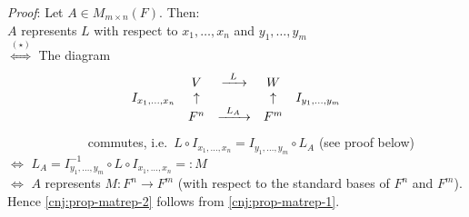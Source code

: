 \documentclass[
  12pt,
  a4paper,
  twoside]{article}
\theoremstyle{plain}
\theoremstyle{definition}
\begin{document}
\emph{Proof}:
Let \(A \in M_{m \times n}(F)\). Then:\\
\(A\) represents \(L\) with respect to \(x_{1}, \dots, x_{n}\) and \(y_{1}, \dots, y_{m}\)\\
\(\stackrel{(\star)}{\iff}\) The diagram
\[\begin{array}{r c c c l} &V & \xrightarrow{ \phantom{a} L \phantom{a}} & W \\
I_{x_1,\dots,x_n} & \uparrow & & \uparrow& I_{y_1,\dots,y_m} \\
& F^{n} & \xrightarrow{\phantom{a} L_{A} \phantom{a}} & F^{m} \end{array}
\]
~~~~~~~~~~~~ commutes, i.e.~\(L \circ I_{x_{1}, \dots, x_{n}} = I_{y_{1}, \dots, y_{m}} \circ L_{A}\) (see proof below)\\
\(\iff\) \(L_{A} = I_{y_{1}, \dots, y_{m}}^{-1} \circ L \circ I_{x_{1}, \dots, x_{n}} =: M\)\\
\(\iff\) \(A\) represents \(M: F^{n} \to F^{m}\) (with respect to the standard bases of \(F^{n}\) and \(F^{m}\)).\\
Hence \ref{cnj:prop-matrep-2} follows from \ref{cnj:prop-matrep-1}.
\end{document}
